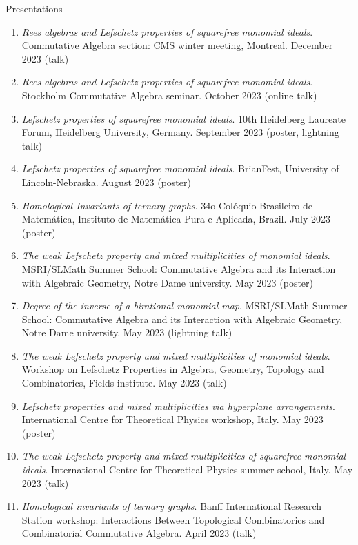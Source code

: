 \documentclass{resume} %
\begin{document}
\begin{rSection}{Presentations}
    \begin{enumerate}[label={}]
        \item \textit{Rees algebras and Lefschetz properties of squarefree monomial ideals}. Commutative Algebra section: CMS winter meeting, Montreal. December 2023 (talk)
        \item \textit{Rees algebras and Lefschetz properties of squarefree monomial ideals}. Stockholm Commutative Algebra seminar. October 2023 (online talk)
        \item \textit{Lefschetz properties of squarefree monomial ideals}. 10th Heidelberg Laureate Forum, Heidelberg University, Germany. September 2023 (poster, lightning talk)
        \item \textit{Lefschetz properties of squarefree monomial ideals}. BrianFest, University of Lincoln-Nebraska. August 2023 (poster)
        \item \textit{Homological Invariants of ternary graphs}. 34o Colóquio Brasileiro de Matemática, Instituto de Matemática Pura e Aplicada, Brazil. July 2023 (poster)
        \item \textit{The weak Lefschetz property and mixed multiplicities of monomial ideals}. MSRI/SLMath Summer School: Commutative Algebra and its Interaction with Algebraic Geometry, Notre Dame university. May 2023 (poster)
        \item \textit{Degree of the inverse of a birational monomial map}. MSRI/SLMath Summer School: Commutative Algebra and its Interaction with Algebraic Geometry, Notre Dame university. May 2023 (lightning talk)
        \item \textit{The weak Lefschetz property and mixed multiplicities of monomial ideals}. Workshop on Lefschetz Properties in Algebra, Geometry, Topology and Combinatorics, Fields institute. May 2023 (talk)
        \item \textit{Lefschetz properties and mixed multiplicities via hyperplane arrangements}. International Centre for Theoretical Physics workshop, Italy. May 2023 (poster)
        \item \textit{The weak Lefschetz property and mixed multiplicities of squarefree monomial ideals}. International Centre for Theoretical Physics summer school, Italy. May 2023 (talk)
        \item \textit{Homological invariants of ternary graphs}. Banff International Research Station workshop: Interactions Between Topological Combinatorics and Combinatorial Commutative Algebra. April 2023 (talk)

\end{enumerate}
\end{rSection}
\end{document}
